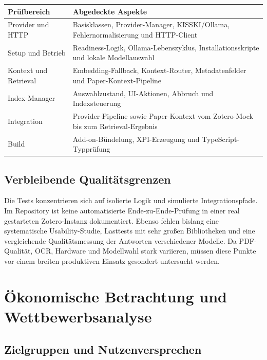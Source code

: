 \documentclass[11pt,a4paper,oneside,parskip=half]{scrartcl}
\begin{document}
\noindent\begin{tabularx}{\linewidth}{@{}L{4.1cm}Y@{}}
\toprule
\textbf{Prüfbereich} & \textbf{Abgedeckte Aspekte} \\
\midrule
Provider und HTTP & Basisklassen, Provider-Manager, KISSKI/Ollama,
  Fehlernormalisierung und HTTP-Client \\
Setup und Betrieb & Readiness-Logik, Ollama-Lebenszyklus,
  Installationsskripte und lokale Modellauswahl \\
Kontext und Retrieval & Embedding-Fallback, Kontext-Router,
  Metadatenfelder und Paper-Kontext-Pipeline \\
Index-Manager & Auswahlzustand, UI-Aktionen, Abbruch und Indexsteuerung \\
Integration & Provider-Pipeline sowie Paper-Kontext vom Zotero-Mock bis zum
  Retrieval-Ergebnis \\
Build & Add-on-Bündelung, XPI-Erzeugung und TypeScript-Typprüfung \\
\bottomrule
\end{tabularx}

\subsection{Verbleibende Qualitätsgrenzen}

Die Tests konzentrieren sich auf isolierte Logik und simulierte
Integrationspfade. Im Repository ist keine automatisierte Ende-zu-Ende-Prüfung
in einer real gestarteten Zotero-Instanz dokumentiert. Ebenso fehlen bislang
eine systematische Usability-Studie, Lasttests mit sehr großen Bibliotheken und
eine vergleichende Qualitätsmessung der Antworten verschiedener Modelle. Da
PDF-Qualität, OCR, Hardware und Modellwahl stark variieren, müssen diese Punkte
vor einem breiten produktiven Einsatz gesondert untersucht werden.

\section{Ökonomische Betrachtung und Wettbewerbsanalyse}

\subsection{Zielgruppen und Nutzenversprechen}
\end{document}
